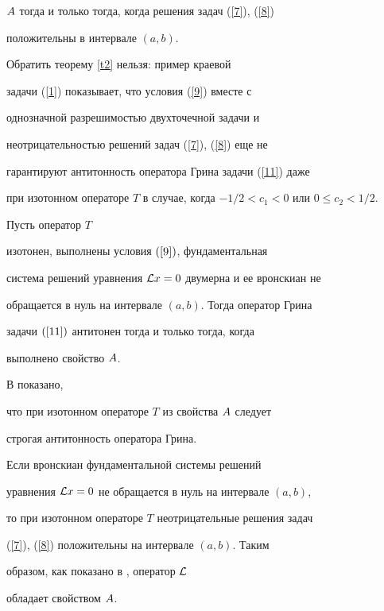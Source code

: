 $A$ тогда и только тогда, когда решения задач (\ref{7}), (\ref{8})


положительны в интервале $(a,b)$.





Обратить теорему \ref{t2} нельзя: пример краевой 


задачи (\ref{1}) показывает, что условия (\ref{9}) вместе с


однозначной разрешимостью двухточечной задачи и


неотрицательностью решений задач (\ref{7}), (\ref{8}) еще не


гарантируют антитонность оператора Грина задачи (\ref{11}) даже


при изотонном операторе $T$ в случае, когда $-1/2<c_1<0$ или $0\le


c_2<1/2$.





\begin{thms}


Пусть оператор $T$


изотонен, выполнены условия $(\ref{9})$, фундаментальная


система решений уравнения ${\cal L} x=0$ двумерна и ее вронскиан не


обращается в нуль на интервале $(a,b)$. Тогда оператор Грина


задачи $(\ref{11})$ антитонен тогда и только тогда, когда


выполнено свойство $A$.


\end{thms}





\begin{pf}


В \cite{AAB} показано,


что при изотонном операторе $T$ из свойства $A$ следует


строгая антитонность оператора Грина.





Если вронскиан фундаментальной системы решений


уравнения ${\cal L} x=0$ не обращается в нуль на интервале $(a,b)$,


то при изотонном операторе $T$ неотрицательные решения задач


(\ref{7}), (\ref{8}) положительны на интервале $(a,b)$. Таким


образом, как показано в \cite{AAB}, оператор ${\cal L}$


обладает свойством $A$.


\end{pf}





